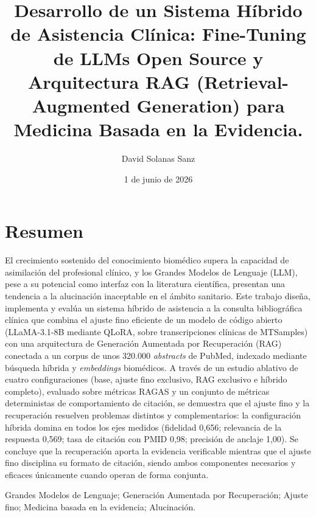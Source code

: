 \documentclass[11pt,a4paper,spanish]{book}
\title{Desarrollo de un Sistema Híbrido de Asistencia Clínica: Fine-Tuning de LLMs Open Source y Arquitectura RAG (Retrieval-Augmented Generation) para Medicina Basada en la Evidencia.}
\author{David Solanas Sanz}
\date{1 de junio de 2026}
\numberwithin{equation}{chapter}
\numberwithin{figure}{chapter}
\begin{document}
\renewcommand{\listfigurename}{Índice de Ilustraciones}
\renewcommand{\listtablename}{Índice de Tablas}
\renewcommand{\contentsname}{Índice de Contenidos}
\renewcommand{\figurename}{Figura}
\renewcommand{\tablename}{Tabla} 

\maketitle

\frontmatter
\tableofcontents
\listoffigures
\listoftables

\chapter{Resumen}
El crecimiento sostenido del conocimiento biomédico supera la capacidad de asimilación del profesional clínico, y los Grandes Modelos de Lenguaje (LLM), pese a su potencial como interfaz con la literatura científica, presentan una tendencia a la alucinación inaceptable en el ámbito sanitario. Este trabajo diseña, implementa y evalúa un sistema híbrido de asistencia a la consulta bibliográfica clínica que combina el ajuste fino eficiente de un modelo de código abierto (LLaMA-3.1-8B mediante QLoRA, sobre transcripciones clínicas de MTSamples) con una arquitectura de Generación Aumentada por Recuperación (RAG) conectada a un corpus de unos 320.000 \textit{abstracts} de PubMed, indexado mediante búsqueda híbrida y \textit{embeddings} biomédicos. A través de un estudio ablativo de cuatro configuraciones (base, ajuste fino exclusivo, RAG exclusivo e híbrido completo), evaluado sobre métricas RAGAS y un conjunto de métricas deterministas de comportamiento de citación, se demuestra que el ajuste fino y la recuperación resuelven problemas distintos y complementarios: la configuración híbrida domina en todos los ejes medidos (fidelidad 0,656; relevancia de la respuesta 0,569; tasa de citación con PMID 0,98; precisión de anclaje 1,00). Se concluye que la recuperación aporta la evidencia verificable mientras que el ajuste fino disciplina su formato de citación, siendo ambos componentes necesarios y eficaces únicamente cuando operan de forma conjunta.

\vspace{1em}
 Grandes Modelos de Lenguaje; Generación Aumentada por Recuperación; Ajuste fino; Medicina basada en la evidencia; Alucinación.
\end{document}
